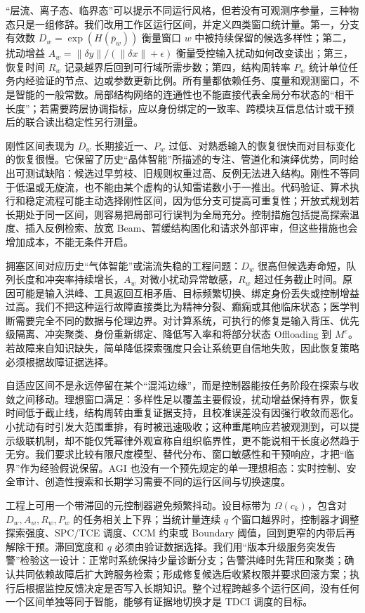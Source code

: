 “层流、离子态、临界态”可以提示不同运行风格，但若没有可观测序参量，三种物态只是一组修辞。我们改用工作区运行区间，并定义四类窗口统计量。第一，分支有效数 $D_w=\exp(H(\bar p_w))$ 衡量窗口 $w$ 中被持续保留的候选多样性；第二，扰动增益 $A_w=\|\delta y\|/(\|\delta x\|+\epsilon)$ 衡量受控输入扰动如何改变读出；第三，恢复时间 $R_w$ 记录越界后回到可行域所需步数；第四，结构周转率 $P_w$ 统计单位任务内经验证的节点、边或参数更新比例。所有量都依赖任务、度量和观测窗口，不是智能的一般常数。局部结构网络的连通性也不能直接代表全局分布状态的“相干长度”；若需要跨层协调指标，应以身份绑定的一致率、跨模块互信息估计或干预后的联合读出稳定性另行测量。

刚性区间表现为 $D_w$ 长期接近一、$P_w$ 过低、对熟悉输入的恢复很快而对目标变化的恢复很慢。它保留了历史“晶体智能”所描述的专注、管道化和演绎优势，同时给出可测试缺陷：候选过早剪枝、旧规则权重过高、反例无法进入结构。刚性不等同于低温或无旋流，也不能由某个虚构的认知雷诺数小于一推出。代码验证、算术执行和稳定流程可能主动选择刚性区间，因为低分支可提高可重复性；开放式规划若长期处于同一区间，则容易把局部可行误判为全局充分。控制措施包括提高探索温度、插入反例检索、放宽 Beam、暂缓结构固化和请求外部评审，但这些措施也会增加成本，不能无条件开启。

拥塞区间对应历史“气体智能”或湍流失稳的工程问题：$D_w$ 很高但候选寿命短，队列长度和冲突率持续增长，$A_w$ 对微小扰动异常敏感，$R_w$ 超过任务截止时间。原因可能是输入洪峰、工具返回互相矛盾、目标频繁切换、绑定身份丢失或控制增益过高。我们不把这种运行故障直接类比为精神分裂、癫痫或其他临床状态；医学判断需要完全不同的数据与伦理边界。对计算系统，可执行的修复是输入背压、优先级隔离、冲突聚类、身份重新绑定、降低写入率和将部分状态 Offloading 到 $M^e$。若故障来自知识缺失，简单降低探索强度只会让系统更自信地失败，因此恢复策略必须根据故障证据选择。

自适应区间不是永远停留在某个“混沌边缘”，而是控制器能按任务阶段在探索与收敛之间移动。理想窗口满足：多样性足以覆盖主要假设，扰动增益保持有界，恢复时间低于截止线，结构周转由重复证据支持，且校准误差没有因强行收敛而恶化。小扰动有时引发大范围重排，有时被迅速吸收；这种重尾响应若被观测到，可以提示级联机制，却不能仅凭幂律外观宣称自组织临界性，更不能说相干长度必然趋于无穷。我们要求比较有限尺度模型、替代分布、窗口敏感性和干预响应，才把“临界”作为经验假说保留。AGI 也没有一个预先规定的单一理想相态：实时控制、安全审计、创造性搜索和长期学习需要不同的运行区间与切换速度。

工程上可用一个带滞回的元控制器避免频繁抖动。设目标带为 $\Omega(c_k)$，包含对 $D_w,A_w,R_w,P_w$ 的任务相关上下界；当统计量连续 $q$ 个窗口越界时，控制器才调整探索强度、SPC/TCE 调度、CCM 约束或 Boundary 阈值，回到更窄的内带后再解除干预。滞回宽度和 $q$ 必须由验证数据选择。我们用“版本升级服务突发告警”检验这一设计：正常时系统保持少量诊断分支；告警洪峰时先背压和聚类；确认共同依赖故障后扩大跨服务检索；形成修复候选后收紧权限并要求回滚方案；执行后根据监控反馈决定是否写入长期知识。整个过程跨越多个运行区间，没有任何一个区间单独等同于智能，能够有证据地切换才是 TDCI 调度的目标。

